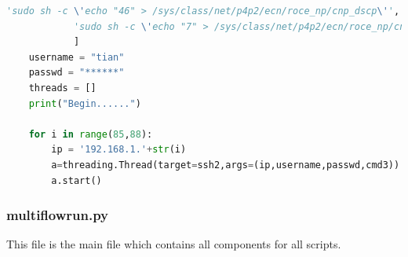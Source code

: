 \documentclass[12pt,a4paper]{article}
\begin{document}
\begin{lstlisting}[language=Python]
            'sudo sh -c \'echo "46" > /sys/class/net/p4p2/ecn/roce_np/cnp_dscp\'',
            'sudo sh -c \'echo "7" > /sys/class/net/p4p2/ecn/roce_np/cnp_802p_prio\'',
            ]
    username = "tian"
    passwd = "******"
    threads = []
    print("Begin......")

    for i in range(85,88):
        ip = '192.168.1.'+str(i)
        a=threading.Thread(target=ssh2,args=(ip,username,passwd,cmd3))
        a.start()

\end{lstlisting}

\subsubsection*{multiflowrun.py}
This file is the main file which contains all components for all scripts.
\end{document}
